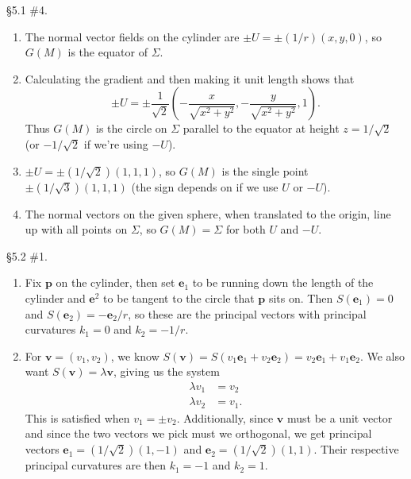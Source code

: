 \documentclass[10pt]{report}
\begin{document}
\begin{exer}[]
\S 5.1 \#4.
\end{exer}
\begin{enumerate}
	\item The normal vector fields on the cylinder are $\pm U = \pm (1/r)(x,y,0)$, so $G(M)$ is the equator of $\Sigma$.
	\item Calculating the gradient and then making it unit length shows that \[\pm U = \pm \frac{1}{\sqrt{2} } \left( -\frac{x}{\sqrt{x^2+y^2} } ,-\frac{y}{\sqrt{x^2+y^2} } ,1 \right).\] Thus $G(M)$ is the circle on $\Sigma$ parallel to the equator at height $z=1/\sqrt{2} $ (or $-1/\sqrt{2} $ if we're using $-U$).
	\item $\pm U = \pm (1/\sqrt{2} )(1,1,1)$, so $G(M)$ is the single point $\pm(1/\sqrt{3} )(1,1,1)$ (the sign depends on if we use $U$ or $-U$).
	\item The normal vectors on the given sphere, when translated to the origin, line up with all points on $\Sigma$, so $G(M) = \Sigma$ for both $U$ and $-U$.
\end{enumerate}

\begin{exer}[]
\S 5.2 \#1.
\end{exer}
\begin{enumerate}
	\item Fix $\mathbf{p}$ on the cylinder, then set $\mathbf{e}_1$ to be running down the length of the cylinder and $\mathbf{e}^2$ to be tangent to the circle that $\mathbf{p}$ sits on. Then $S(\mathbf{e}_1)=0$ and $S(\mathbf{e}_2)=-\mathbf{e}_2/r$, so these are the principal vectors with principal curvatures $k_1=0$ and $k_2=-1/r$.

	\item For $\mathbf{v}=(v_1,v_2)$, we know $S(\mathbf{v}) = S(v_1\mathbf{e}_1+v_2\mathbf{e}_2) = v_2\mathbf{e}_1 + v_1\mathbf{e}_2$. We also want $S(\mathbf{v}) = \lambda \mathbf{v}$, giving us the system
		\begin{align*}
			\lambda v_1 &= v_2 \\
			\lambda v_2 &= v_1.
		\end{align*}
		This is satisfied when $v_1 = \pm v_2$. Additionally, since $\mathbf{v}$ must be a unit vector and since the two vectors we pick must we orthogonal, we get principal vectors $\mathbf{e}_1 = (1/\sqrt{2} )(1,-1)$ and $\mathbf{e}_2=(1/\sqrt{2} )(1,1)$. Their respective principal curvatures are then $k_1=-1$ and $k_2=1$.
\end{enumerate}
\end{document}

